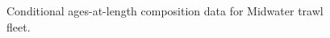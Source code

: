 \documentclass[
]{scrartcl}
\begin{document}
\begin{figure}[H]


\caption{\label{fig-caal_flt5}Conditional ages-at-length composition
data for Midwater trawl fleet.}

\end{figure}%
\end{document}
